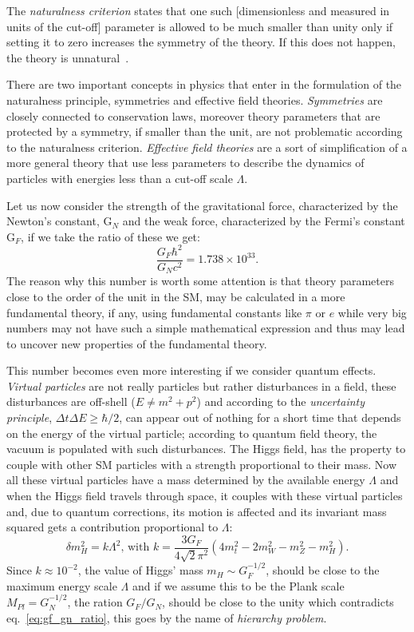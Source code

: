 The \emph{naturalness criterion} states that one such [dimensionless and
measured in units of the cut-off] parameter is allowed to be much smaller than
unity only if setting it to zero increases the symmetry of the theory. If this
does not happen, the theory is unnatural~\cite{thooft:gauge}.

There are two important concepts in physics that enter in the formulation of the
naturalness principle, symmetries and effective field
theories. \emph{Symmetries} are closely connected to conservation laws, moreover
theory parameters that are protected by a symmetry, if smaller than the unit,
are not problematic according to the naturalness criterion. \emph{Effective
  field theories} are a sort of simplification of a more general theory that use
less parameters to describe the dynamics of particles with energies less than a
cut-off scale $\Lambda$.

Let us now consider the strength of the gravitational force, characterized by
the Newton's constant, G$_N$ and the weak force, characterized by the Fermi's
constant G$_F$, if we take the ratio of these we get:
\begin{equation}
  \label{eq:gf_gn_ratio}
  \frac{G_F \hbar^2}{G_N c^2} = 1.738 \times 10^{33}.
\end{equation}
The reason why this number is worth some attention is that theory parameters
close to the order of the unit in the SM, may be calculated in a more
fundamental theory, if any, using fundamental constants like $\pi$ or $e$ while
very big numbers may not have such a simple mathematical expression and thus may
lead to uncover new properties of the fundamental theory.

This number becomes even more interesting if we consider quantum effects.
\emph{Virtual particles} are not really particles but rather disturbances in a
field, these disturbances are off-shell ($E \neq m^2 + p^2$) and according to
the \emph{uncertainty principle}, $\Delta t \Delta E \geq \hbar / 2$, can appear
out of nothing for a short time that depends on the energy of the virtual
particle; according to quantum field theory, the vacuum is populated with such
disturbances. The Higgs field, has the property to couple with other SM
particles with a strength proportional to their mass. Now all these virtual
particles have a mass determined by the available energy $\Lambda$ and when the
Higgs field travels through space, it couples with these virtual particles and,
due to quantum corrections, its motion is affected and its invariant mass
squared gets a contribution proportional to $\Lambda$:
\begin{equation}
  \label{eq:delta_mh}
  \delta m_H^2 = k \Lambda^2 \text{, with } k = \frac{3 G_F}{4 \sqrt{2}
    \pi^2}(4m_t^2 - 2m_W^2 - m_Z^2 - m_H^2).
\end{equation}
Since $k \approx 10^{-2}$\cite{Giudice:2008bi}, the value of Higgs' mass
$m_H \sim G_F^{-1/2}$, should be close to the maximum energy scale $\Lambda$ and
if we assume this to be the Plank scale $M_{Pl} = G_N^{-1/2}$, the ration
$G_F/G_N$, should be close to the unity which contradicts
eq.~\eqref{eq:gf_gn_ratio}, this goes by the name of \emph{hierarchy problem}.

